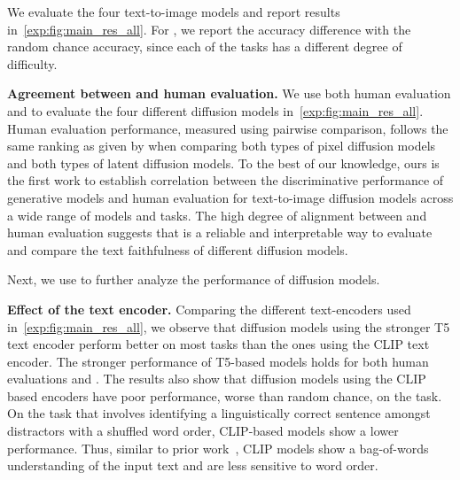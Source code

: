 We evaluate the four text-to-image models and report results in~\cref{exp:fig:main_res_all}.
For \OURS, we report the accuracy difference with the random chance accuracy, since each of the tasks has a different degree of difficulty.






\par \noindent \textbf{Agreement between \OURS and human evaluation.}
We use both human evaluation and \OURS to evaluate the four different diffusion models in~\cref{exp:fig:main_res_all}.
Human evaluation performance, measured using pairwise comparison, follows the same ranking as given by \OURS when comparing both types of pixel diffusion models and both types of latent diffusion models.
To the best of our knowledge, ours is the first work to establish correlation between the discriminative performance of generative models and human evaluation for text-to-image diffusion models across a wide range of models and tasks.
The high degree of alignment between \OURS and human evaluation suggests that \OURS is a reliable and interpretable way to evaluate and compare the text faithfulness of different diffusion models.

Next, we use \OURS to further analyze the performance of diffusion models.

\par \noindent \textbf{Effect of the text encoder.}
Comparing the different text-encoders used in~\cref{exp:fig:main_res_all}, we observe that diffusion models using the stronger T5 text encoder perform better on most tasks than the ones using the CLIP text encoder.
The stronger performance of T5-based models holds for both human evaluations and \OURS.
The \OURS results also show that diffusion models using the CLIP based encoders have poor performance, worse than random chance, on the  task.
On the  task that involves identifying a linguistically correct sentence amongst distractors with a shuffled word order, CLIP-based models show a lower performance.
Thus, similar to prior work~\cite{yuksekgonul2023when}, CLIP models show a bag-of-words understanding of the input text and are less sensitive to word order.

